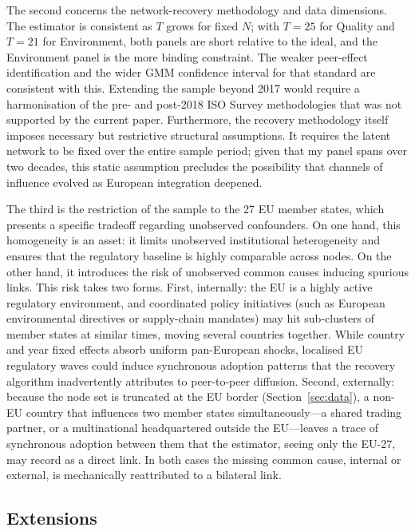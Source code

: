 \documentclass[12pt,a4paper]{article}
\begin{document}
The second concerns the network-recovery methodology and data dimensions. The \citet{depaula2025} estimator is consistent as $T$ grows for fixed $N$; with $T = 25$ for Quality and $T = 21$ for Environment, both panels are short relative to the ideal, and the Environment panel is the more binding constraint. The weaker peer-effect identification and the wider GMM confidence interval for that standard are consistent with this. Extending the sample beyond 2017 would require a harmonisation of the pre- and post-2018 ISO Survey methodologies that was not supported by the current paper. Furthermore, the recovery methodology itself imposes necessary but restrictive structural assumptions. It requires the latent network to be fixed over the entire sample period; given that my panel spans over two decades, this static assumption precludes the possibility that channels of influence evolved as European integration deepened.

The third is the restriction of the sample to the 27 EU member states, which presents a specific tradeoff regarding unobserved confounders. On one hand, this homogeneity is an asset: it limits unobserved institutional heterogeneity and ensures that the regulatory baseline is highly comparable across nodes. On the other hand, it introduces the risk of unobserved common causes inducing spurious links. This risk takes two forms. First, internally: the EU is a highly active regulatory environment, and coordinated policy initiatives (such as European environmental directives or supply-chain mandates) may hit sub-clusters of member states at similar times, moving several countries together. While country and year fixed effects absorb uniform pan-European shocks, localised EU regulatory waves could induce synchronous adoption patterns that the recovery algorithm inadvertently attributes to peer-to-peer diffusion. Second, externally: because the node set is truncated at the EU border (Section~\ref{sec:data}), a non-EU country that influences two member states simultaneously---a shared trading partner, or a multinational headquartered outside the EU---leaves a trace of synchronous adoption between them that the estimator, seeing only the EU-27, may record as a direct link. In both cases the missing common cause, internal or external, is mechanically reattributed to a bilateral link.
\subsection{Extensions}
\label{sec:extensions}
\end{document}
